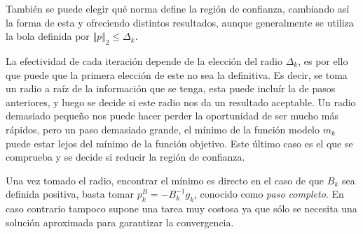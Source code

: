 \documentclass[11pt,a4paper]{book}
\theoremstyle{definition}
\theoremstyle{remark}
\begin{document}
También se puede elegir qué norma define la región de confianza, cambiando así la forma de esta y ofreciendo distintos resultados, aunque generalmente se utiliza la bola definida por $\Vert p \Vert_2 \leq \Delta_k$.

La efectividad de cada iteración depende de la elección del radio $\Delta_k$, es por ello que puede que la primera elección de este no sea la definitiva. Es decir, se toma un radio a raíz de la información que se tenga, esta puede incluír la de pasos anteriores, y luego se decide si este radio nos da un resultado aceptable. Un radio demasiado pequeño nos puede hacer perder la oportunidad de ser mucho más rápidos, pero un paso demasiado grande, el mínimo de la función modelo $m_k$ puede estar lejos del mínimo de la función objetivo. Este último caso es el que se comprueba y se decide si reducir la región de confianza.

Una vez tomado el radio, encontrar el mínimo es directo en el caso de que $B_k$ sea definida positiva, basta tomar $p_k^B = -B_k^{-1}g_k$, conocido como \textit{paso completo}. En caso contrario tampoco supone una tarea muy costosa ya que sólo se necesita una solución aproximada para garantizar la convergencia.
\end{document}
